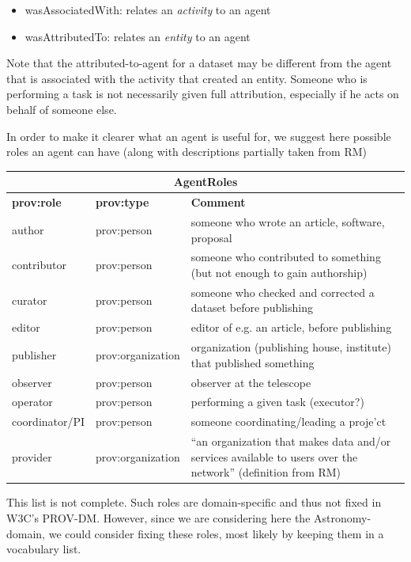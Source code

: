 \documentclass[11pt,a4paper]{ivoa}
\begin{document}
\begin{itemize}
\item wasAssociatedWith: relates an \emph{activity} to an agent
\item wasAttributedTo: relates an \emph{entity} to an agent
\end{itemize}

Note that the attributed-to-agent for a dataset may be different from the agent that is associated with the activity that created an entity. Someone who is performing a task is not necessarily given full attribution, especially if he acts on behalf of someone else.

In order to make it clearer what an agent is useful for, we suggest here possible roles an agent can have (along with descriptions partially taken from RM)\\
\begin{center}
\begin{tabular}{l|l|p{}}
\multicolumn{3}{c}{\textbf{AgentRoles}}\\ \hline
\textbf{prov:role} & \textbf{prov:type} & \textbf{Comment} \\ \hline
author & prov:person & someone who wrote an article, software, proposal\\
contributor & prov:person & someone who contributed to something (but not enough to gain authorship)\\
curator & prov:person & someone who checked and corrected a dataset before publishing\\
editor & prov:person & editor of e.g. an article, before publishing\\
publisher & prov:organization & organization (publishing house, institute) that published something\\
observer & prov:person & observer at the telescope\\
operator & prov:person & performing a given task (executor?)\\
coordinator/PI & prov:person & someone coordinating/leading a proje'ct\\
provider & prov:organization & ``an organization that makes data and/or services available to users over the network'' (definition from RM)
\end{tabular}
\label{tab:agentroles}
\end{center}
This list is not complete. Such roles are domain-specific and thus not fixed in W3C's PROV-DM. However, since we are considering here the Astronomy-domain, we could 
consider fixing these roles, most likely by keeping them in a vocabulary list.
\end{document}
